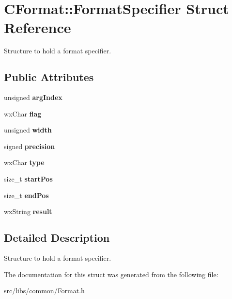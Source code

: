 \section{CFormat::FormatSpecifier Struct Reference}
\label{structCFormat_1_1FormatSpecifier}


Structure to hold a format specifier.  
\subsection*{Public Attributes}
\begin{DoxyCompactItemize}
\item 
unsigned {\bf argIndex}\label{structCFormat_1_1FormatSpecifier_aaa02321e27f1eab6917d7564f07f6c4e}

\item 
wxChar {\bf flag}\label{structCFormat_1_1FormatSpecifier_ad47b771fdcd022ed74e550787dc677aa}

\item 
unsigned {\bf width}\label{structCFormat_1_1FormatSpecifier_acfcf88b69e3de9b9b296106b090952f7}

\item 
signed {\bf precision}\label{structCFormat_1_1FormatSpecifier_a44fd3c60237a73a3c88315773d0e7c6a}

\item 
wxChar {\bf type}\label{structCFormat_1_1FormatSpecifier_a00796b417b888a7603008835ad1a8320}

\item 
size\_\-t {\bf startPos}\label{structCFormat_1_1FormatSpecifier_a25589fd314916b825b95dc657c3fd7a2}

\item 
size\_\-t {\bf endPos}\label{structCFormat_1_1FormatSpecifier_af1810d28c902885c8089f7f7ca752d8e}

\item 
wxString {\bf result}\label{structCFormat_1_1FormatSpecifier_a1768794e312158ad0fe5d13bacad81b4}

\end{DoxyCompactItemize}


\subsection{Detailed Description}
Structure to hold a format specifier. 

The documentation for this struct was generated from the following file:\begin{DoxyCompactItemize}
\item 
src/libs/common/Format.h\end{DoxyCompactItemize}
